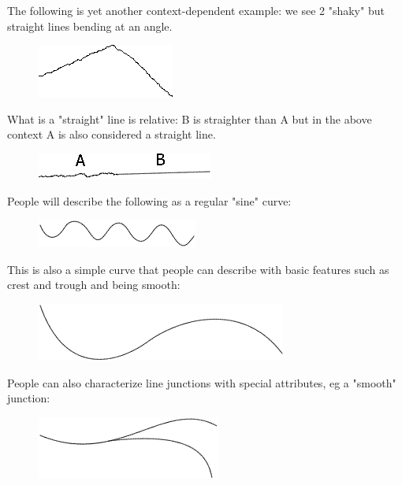 The following is yet another context-dependent example: we see 2 "shaky" but straight lines bending at an angle.

\begin{figure}[H]
\centering
\includegraphics[scale=0.7]{Line4.PNG}
\end{figure}

What is a "straight" line is relative: B is straighter than A but in the above context A is also considered a straight line. 

\begin{figure}[H]
\centering
\includegraphics[scale=0.7]{Line7.PNG}
\end{figure}

People will describe the following as a regular "sine" curve:

\begin{figure}[H]
\centering
\includegraphics[scale=0.7]{Line5.PNG}
\end{figure}

This is also a simple curve that people can describe with basic features such as crest and trough and being smooth:

\begin{figure}[H]
\centering
\includegraphics[scale=0.7]{Line6.PNG}
\end{figure}

People can also characterize line junctions with special attributes, eg a "smooth" junction:

\begin{figure}[H]
\centering
\includegraphics[scale=0.7]{Line8.PNG}
\end{figure}

